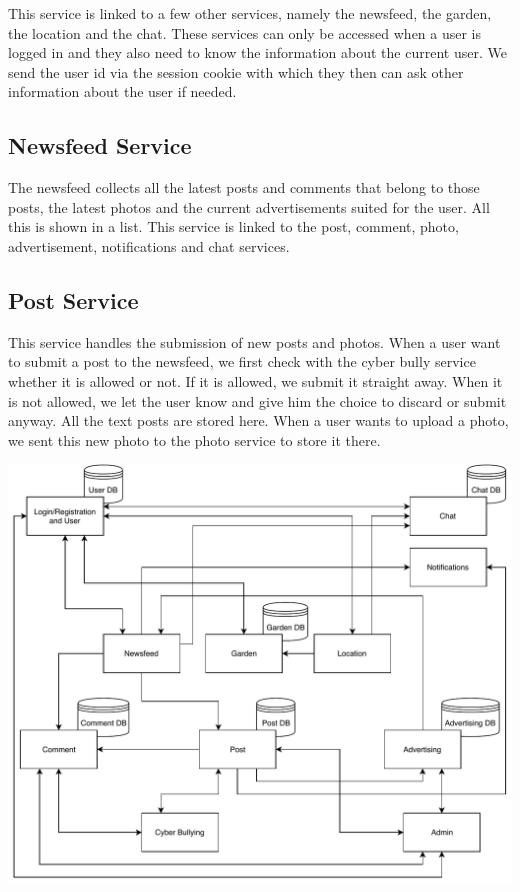 \documentclass[a4paper,12pt]{article}
\begin{document}
This service is linked to a few other services, namely the newsfeed, the garden, the location and the chat. These services can only be accessed when a user is logged in and they also need to know the information about the current user. We send the user id via the session cookie with which they then can ask other information about the user if needed. 

\subsection{Newsfeed Service}

The newsfeed collects all the latest posts and comments that belong to those posts, the latest photos and the current advertisements suited for the user. All this is shown in a list. This service is linked to the post, comment, photo, advertisement, notifications and chat services.

\subsection{Post Service}

This service handles the submission of new posts and photos. When a user want to submit a post to the newsfeed, we first check with the cyber bully service whether it is allowed or not. If it is allowed, we submit it straight away. When it is not allowed, we let the user know and give him the choice to discard or submit anyway. All the text posts are stored here. When a user wants to upload a photo, we sent this new photo to the photo service to store it there.

\begin{adjustwidth}{-3cm}{}
\includegraphics[scale=1]{Microservices_architecture_final.pdf} 
\end{adjustwidth}
\end{document}
